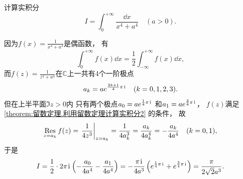 \begin{example}
计算实积分\begin{equation*}
	I = \int_0^{+\infty} \frac{\dd{x}}{x^4+a^4} \quad(a>0).
\end{equation*}
\begin{solution}
因为\(f(x) = \frac{1}{x^4+a^4}\)是偶函数，
有\begin{equation*}
	\int_0^{+\infty} f(x) \dd{x}
	= \frac{1}{2} \int_{-\infty}^{+\infty} f(x) \dd{x},
\end{equation*}
而\(f(z) = \frac{1}{z^4+a^4}\)在\(\mathbb{C}\)上一共有4个一阶极点\begin{equation*}
	a_k = a e^{\frac{2k+1}{4}\pi\kern1pt\mathrm{i}\kern1pt} \quad(k=0,1,2,3).
\end{equation*}
但在上半平面\(\Im z > 0\)内
只有两个极点\(a_0 = a e^{\frac{1}{4}\pi\kern1pt\mathrm{i}\kern1pt}\)
和\(a_1 = a e^{\frac{3}{4}\pi\kern1pt\mathrm{i}\kern1pt}\)，
\(f(z)\)满足\cref{theorem:留数定理.利用留数定理计算实积分2} 的条件，
故\begin{equation*}
	\Res_{z=a_k} f(z)
	= \eval{\frac{1}{4z^3}}_{z=a_k}
	= \frac{1}{4a_k^3}
	= \frac{a_k}{4a_k^4}
	= -\frac{a_k}{4a^4}
	\quad(k=0,1),
\end{equation*}
于是\begin{equation*}
	I = \frac{1}{2} \cdot 2\pi\kern1pt\mathrm{i}\kern1pt \left(-\frac{a_0}{4a^4}-\frac{a_1}{4a^4}\right)
	= -\frac{\pi\kern1pt\mathrm{i}\kern1pt}{4a^3} \left(e^{\frac{1}{4}\pi\kern1pt\mathrm{i}\kern1pt} + e^{\frac{3}{4}\pi\kern1pt\mathrm{i}\kern1pt}\right)
	= \frac{\pi}{2\sqrt{2}a^3}.
\end{equation*}
\end{solution}
\end{example}

